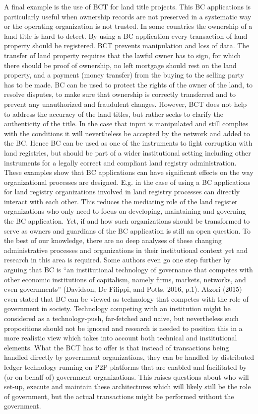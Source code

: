 A final example is the use of BCT for land title projects. This BC applications is particularly useful when ownership records are not preserved in a systematic way or the operating organization is not trusted. In some countries the ownership of a land title is hard to detect. By using a BC application every transaction of land property should be registered. BCT prevents manipulation and loss of data. The transfer of land property requires that the lawful owner has to sign, for which there should be proof of ownership, no left mortgage should rest on the land property, and a payment (money transfer) from the buying to the selling party has to be made. BC can be used to protect the rights of the owner of the land, to resolve disputes, to make sure that ownership is correctly transferred and to prevent any unauthorized and fraudulent changes. However, BCT does not help to address the accuracy of the land titles, but rather seeks to clarify the authenticity of the title. In the case that input is manipulated and still complies with the conditions it will nevertheless be accepted by the network and added to the BC. Hence BC can be used as one of the instruments to fight corruption with land registries, but should be part of a wider institutional setting including other instruments for a legally correct and compliant land registry administration.
These examples show that BC applications can have significant effects on the way organizational processes are designed. E.g. in the case of using a BC applications for land registry organizations involved in land registry processes can directly interact with each other. This reduces the mediating role of the land register organizations who only need to focus on developing, maintaining and governing the BC application. Yet, if and how such organizations should be transformed to serve as owners and guardians of the BC application is still an open question. To the best of our knowledge, there are no deep analyses of these changing administrative processes and organizations in their institutional context yet and research in this area is required.
Some authors even go one step further by arguing that BC is “an institutional technology of governance that competes with other economic institutions of capitalism, namely firms, markets, networks, and even governments” (Davidson, De Filippi, and Potts, 2016, p.1). Atzori (2015) even stated that BC can be viewed as technology that competes with the role of government in society. Technology competing with an institution might be considered as a technology-push, far-fetched and naive, but nevertheless such propositions should not be ignored and research is needed to position this in a more realistic view which takes into account both technical and institutional elements. What the BCT has to offer is that instead of transactions being handled directly by government organizations, they can be handled by distributed ledger technology running on P2P platforms that are enabled and facilitated by (or on behalf of) government organizations. This raises questions about who will set-up, execute and maintain these architectures which will likely still be the role of government, but the actual transactions might be performed without the government.\textcite{olnes2017blockchain}

